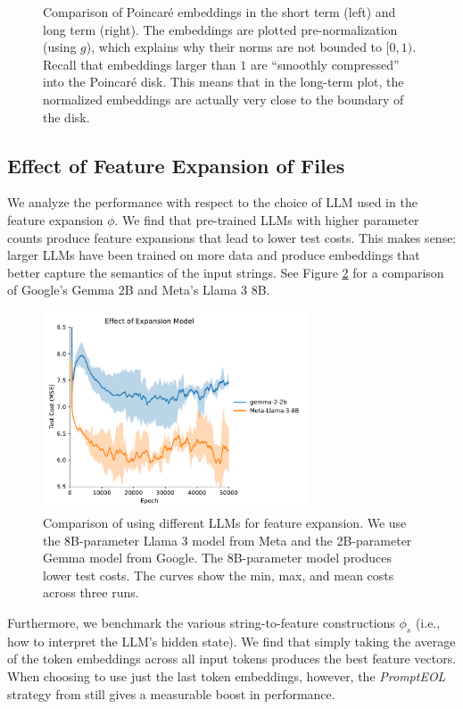 \documentclass{article}
\begin{document}
\begin{figure}[H]
\begin{minipage}{0.35\textwidth}
  \end{minipage}
  \caption{Comparison of Poincaré embeddings in the short term (left) and long term (right). The embeddings are plotted pre-normalization (using $g$), which explains why their norms are not bounded to $[0, 1)$. Recall that embeddings larger than $1$ are ``smoothly compressed'' into the Poincaré disk. This means that in the long-term plot, the normalized embeddings are actually very close to the boundary of the disk.}
  \label{fig:short-and-long-term-embeddings}
\end{figure}

\subsection{Effect of Feature Expansion of Files}

We analyze the performance with respect to the choice of LLM used in the feature expansion $\phi$. We find that pre-trained LLMs with higher parameter counts produce feature expansions that lead to lower test costs. This makes sense: larger LLMs have been trained on more data and produce embeddings that better capture the semantics of the input strings. See Figure \ref{fig:expansion-model} for a comparison of Google's Gemma 2B and Meta's Llama 3 8B.

\begin{figure}[H]
  \centering
  \includegraphics[width=0.7\textwidth]{figures/expansion_model.pdf}
  \caption{Comparison of using different LLMs for feature expansion. We use the 8B-parameter Llama 3 model from Meta and the 2B-parameter Gemma model from Google. The 8B-parameter model produces lower test costs. The curves show the min, max, and mean costs across three runs.}
  \label{fig:expansion-model}
\end{figure}

Furthermore, we benchmark the various string-to-feature constructions $\phi_s$ (i.e., how to interpret the LLM's hidden state). We find that simply taking the average of the token embeddings across all input tokens produces the best feature vectors. When choosing to use just the last token embeddings, however, the \emph{PromptEOL} strategy from \cite{jiang2023scalingsentenceembeddingslarge} still gives a measurable boost in performance.
\end{document}

